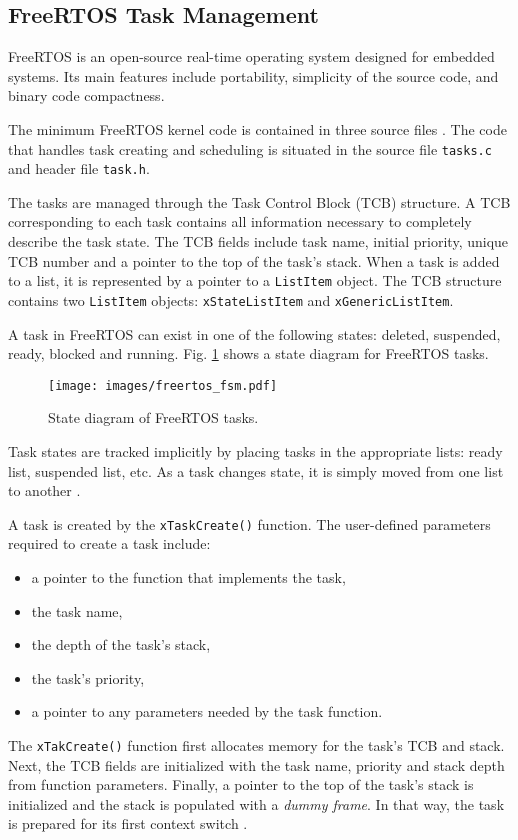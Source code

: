\subsection{FreeRTOS Task Management}
FreeRTOS is an open-source real-time operating system designed for embedded systems. 
Its main features include portability, simplicity of the source code, and binary code compactness. 

The minimum FreeRTOS kernel code is contained in three source files \cite{brown2012architecture}. 
The code that handles task creating and scheduling is situated in the source file \verb$tasks.c$ and header file \verb$task.h$.

The tasks are managed through the Task Control Block (TCB) structure. 
A TCB corresponding to each task contains all information necessary to completely describe the task state. 
The TCB fields include task name, initial priority, unique TCB number and a pointer to the top of the task's stack. 
When a task is added to a list, it is represented by a pointer to a \verb$ListItem$ object. 
The TCB structure contains two \verb$ListItem$ objects: \verb$xStateListItem$ and \verb$xGenericListItem$.

A task in FreeRTOS can exist in one of the following states: deleted, suspended, ready, blocked and running. 
Fig. \ref{freertos:state} shows a state diagram for FreeRTOS tasks. 
\begin{figure}[ht]
    \centering
    \texttt{[image: images/freertos\_fsm.pdf]}
    \caption{State diagram of FreeRTOS tasks.}
    \label{freertos:state}
\end{figure}
Task states are tracked implicitly by placing tasks in the appropriate lists: ready list, suspended list, etc. As a task changes state, it is simply moved from one list to another 
\cite{brown2012architecture}.

A task is created by the \verb$xTaskCreate()$ function. 
The user-defined parameters required to create a task include: 
\begin{itemize}
	\item a pointer to the function that implements the task,
	\item the task name,
	\item the depth of the task's stack,
	\item the task's priority,
	\item a pointer to any parameters needed by the task function.
\end{itemize}
The \verb$xTakCreate()$ function first allocates memory for the task's TCB and stack.
Next, the TCB fields are initialized with the task name, priority and stack depth from function parameters. 
Finally, a pointer to the top of the task's stack is initialized and the stack is populated with a \textit{dummy frame}. 
In that way, the task is prepared for its first context switch \cite{goyette2007analysis}.

